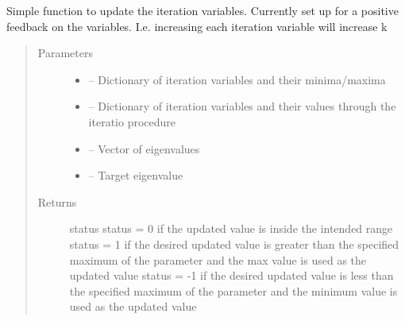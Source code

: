 \documentclass[letterpaper,10pt,english]{sphinxmanual}
\begin{document}
\begin{fulllineitems}
\label{\detokenize{iterator:critops.iterator.update_itervar}}
Simple function to update the iteration variables.
Currently set up for a positive feedback on the variables.
I.e. increasing each iteration variable will increase k
\begin{quote}\begin{description}
\item[{Parameters}] \leavevmode\begin{itemize}
\item {} 
 -- Dictionary of iteration variables and their minima/maxima

\item {} 
 -- Dictionary of iteration variables and their values through the iteratio procedure

\item {} 
 -- Vector of eigenvalues

\item {} 
 -- Target eigenvalue

\end{itemize}

\item[{Returns}] \leavevmode
status
status = 0 if the updated value is inside the intended range
status = 1 if the desired updated value is greater than the specified maximum of the parameter
and the max value is used as the updated value
status = -1 if the desired updated value is less than the specified maximum of the parameter
and the minimum value is used as the updated value

\end{description}\end{quote}

\end{fulllineitems}

\end{document}
